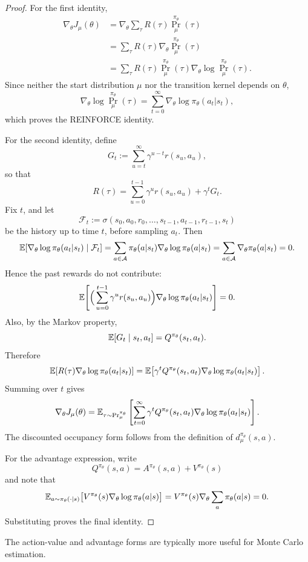 \begin{proof}
For the first identity,
\begin{align*}
\nabla_\theta J_\mu(\theta)
&=
\nabla_\theta \sum_\tau R(\tau){\Pr}_\mu^{\pi_\theta}(\tau) \\
&=
\sum_\tau R(\tau)\nabla_\theta {\Pr}_\mu^{\pi_\theta}(\tau) \\
&=
\sum_\tau R(\tau){\Pr}_\mu^{\pi_\theta}(\tau)\nabla_\theta \log {\Pr}_\mu^{\pi_\theta}(\tau).
\end{align*}
Since neither the start distribution $\mu$ nor the transition kernel depends on $\theta$,
\[
\nabla_\theta \log {\Pr}_\mu^{\pi_\theta}(\tau)
=
\sum_{t=0}^\infty \nabla_\theta \log \pi_\theta(a_t|s_t),
\]
which proves the REINFORCE identity.

For the second identity, define
\[
G_t := \sum_{u=t}^\infty \gamma^{u-t} r(s_u,a_u),
\]
so that
\[
R(\tau)=\sum_{u=0}^{t-1}\gamma^u r(s_u,a_u)+\gamma^t G_t.
\]
Fix $t$, and let
\[
\mathcal{F}_t:=\sigma(s_0,a_0,r_0,\ldots,s_{t-1},a_{t-1},r_{t-1},s_t)
\]
be the history up to time $t$, before sampling $a_t$.
Then
\[
\mathbb{E}\!\left[\nabla_\theta \log \pi_\theta(a_t|s_t)\mid \mathcal{F}_t\right]
=
\sum_{a\in\mathcal{A}}\pi_\theta(a|s_t)\nabla_\theta \log \pi_\theta(a|s_t)
=
\sum_{a\in\mathcal{A}}\nabla_\theta \pi_\theta(a|s_t)
=
0.
\]
Hence the past rewards do not contribute:
\[
\mathbb{E}\!\left[
\Big(\sum_{u=0}^{t-1}\gamma^u r(s_u,a_u)\Big)\nabla_\theta \log \pi_\theta(a_t|s_t)
\right]
=
0.
\]
Also, by the Markov property,
\[
\mathbb{E}[G_t\mid s_t,a_t] = Q^{\pi_\theta}(s_t,a_t).
\]
Therefore
\[
\mathbb{E}\!\left[R(\tau)\nabla_\theta \log \pi_\theta(a_t|s_t)\right]
=
\mathbb{E}\!\left[\gamma^t Q^{\pi_\theta}(s_t,a_t)\nabla_\theta \log \pi_\theta(a_t|s_t)\right].
\]
Summing over $t$ gives
\[
\nabla_\theta J_\mu(\theta)
=
\mathbb{E}_{\tau\sim {\Pr}^{\pi_\theta}_\mu}
\left[
\sum_{t=0}^\infty \gamma^t Q^{\pi_\theta}(s_t,a_t)\nabla_\theta \log \pi_\theta(a_t|s_t)
\right].
\]
The discounted occupancy form follows from the definition of $d_\mu^{\pi_\theta}(s,a)$.

For the advantage expression, write
\[
Q^{\pi_\theta}(s,a)=A^{\pi_\theta}(s,a)+V^{\pi_\theta}(s)
\]
and note that
\[
\mathbb{E}_{a\sim \pi_\theta(\cdot|s)}
\big[V^{\pi_\theta}(s)\nabla_\theta \log \pi_\theta(a|s)\big]
=
V^{\pi_\theta}(s)\nabla_\theta \sum_a \pi_\theta(a|s)
=
0.
\]
Substituting proves the final identity.
\end{proof}

The action-value and advantage forms are typically more useful for Monte Carlo estimation.

